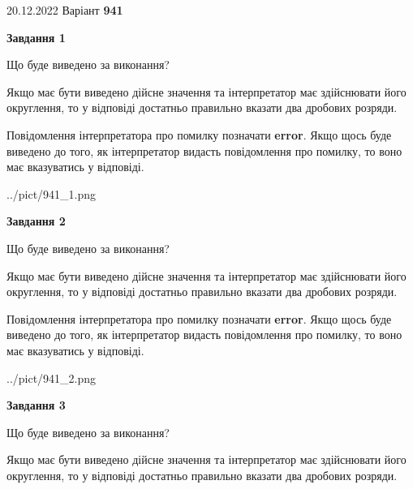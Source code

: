 \documentclass[12pt, ukrainian]{article}
\begin{document}
{20.12.2022 Варіант \No \textbf { 941 }\par}
{
\begin {Large}

{\begin {center}\textbf{Завдання 1}\end {center}}\par
Що буде виведено за виконання? \par

Якщо має бути виведено дійсне значення та інтерпретатор має здійснювати його округлення, 
то у відповіді достатньо правильно вказати два дробових розряди.

Повідомлення інтерпретатора про помилку позначати \textbf{error}.
Якщо щось буде виведено до того, як інтерпретатор видасть повідомлення про помилку, 
то воно має вказуватись у відповіді. \par

\begin{center}
	{../pict/941_1.png}
\end{center}
\newpage

{\begin {center}\textbf{Завдання 2}\end {center}}\par
Що буде виведено за виконання? \par

Якщо має бути виведено дійсне значення та інтерпретатор має здійснювати його округлення, 
то у відповіді достатньо правильно вказати два дробових розряди.

Повідомлення інтерпретатора про помилку позначати \textbf{error}.
Якщо щось буде виведено до того, як інтерпретатор видасть повідомлення про помилку, 
то воно має вказуватись у відповіді. \par

\begin{center}
	{../pict/941_2.png}
\end{center}
\newpage

{\begin {center}\textbf{Завдання 3}\end {center}}\par
Що буде виведено за виконання? \par

Якщо має бути виведено дійсне значення та інтерпретатор має здійснювати його округлення, 
то у відповіді достатньо правильно вказати два дробових розряди.


\end{Large}}
\end{document}
